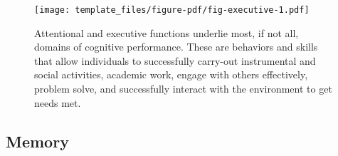 \documentclass[
  letterpaper,
  DIV=11,
  numbers=noendperiod,
  oneside]{scrartcl}
\begin{document}
\begin{figure}

{\centering \texttt{[image: template\_files/figure-pdf/fig-executive-1.pdf]}

}

\caption{\label{fig-executive}Attentional and executive functions
underlie most, if not all, domains of cognitive performance. These are
behaviors and skills that allow individuals to successfully carry-out
instrumental and social activities, academic work, engage with others
effectively, problem solve, and successfully interact with the
environment to get needs met.}

\end{figure}

\hypertarget{memory}{%
\subsection{Memory}\label{memory}}
\end{document}
